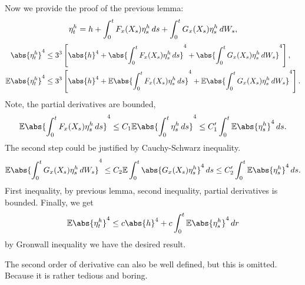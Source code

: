 Now we provide the proof of the previous lemma: 
\begin{equation*}
    \eta_t^h = h + \int_0^t F_x(X_s) \eta_s^h \mathop{}\!d s+\int_0^t G_x(X_s) \eta_s^h \mathop{}\!d W_s,
\end{equation*}
\begin{align*}
    \abs{\eta_t^h}^4 &\leq 3^3\left[\abs{h}^4 + \abs{\int_0^t F_x(X_s) \eta_s^h \diff s}^4 + \abs{\int_0^t G_x(X_s) \eta_s^h \diff W_s}^4\right], \\
    \E\abs{\eta_t^h}^4  &\leq 3^3\left[\abs{h}^4 + \E \abs{\int_0^t F_x(X_s) \eta_s^h \diff s}^4 + \E \abs{\int_0^t G_x(X_s) \eta_s^h \diff W_s}^4\right].
\end{align*}
Note, the partial derivatives are bounded, 
\begin{equation*}
    \E \abs{\int_0^t F_x(X_s) \eta_s^h \diff s}^4 \leq C_1 \E \abs{\int_0^t \eta_s^h \diff s}^4 \leq C_1' \int_0^t \E\abs{\eta_s^h}^4 \diff s.
\end{equation*} The second step could be justified by Cauchy-Schwarz inequality.
\begin{equation*}
    \E \abs{\int_0^t G_x(X_s) \eta_s^h \diff W_s}^4 \leq C_2 \E\int_0^t \abs{ G_x(X_s) \eta_s^h }^4\diff s \leq C_2' \int_0^t\E \abs{\eta_s^h }^4\diff s.
\end{equation*} First inequality, by previous lemma, second inequality, partial derivatives is bounded. Finally, we get 
\begin{equation*}
    \E\abs{\eta_t^h}^4 \leq c\abs{h}^4 + c\int_0^t \E\abs{\eta_s^h}^4 \diff r
\end{equation*}
by Gronwall inequality we have the desired result.

\begin{rem}
The second order of derivative can also be well defined, but this is omitted. Because it is rather tedious and boring.
\end{rem}

